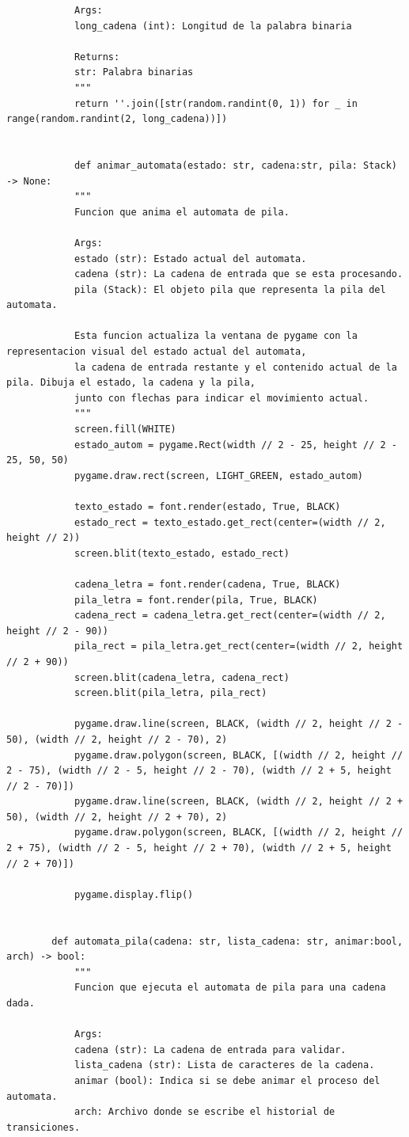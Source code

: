 \documentclass[11pt]{article} %
\begin{document}
\begin{lstlisting}
			Args:
			long_cadena (int): Longitud de la palabra binaria
			
			Returns:
			str: Palabra binarias
			"""
			return ''.join([str(random.randint(0, 1)) for _ in range(random.randint(2, long_cadena))])
			
			
			def animar_automata(estado: str, cadena:str, pila: Stack) -> None:
			"""
			Funcion que anima el automata de pila.
			
			Args:
			estado (str): Estado actual del automata.
			cadena (str): La cadena de entrada que se esta procesando.
			pila (Stack): El objeto pila que representa la pila del automata.
			
			Esta funcion actualiza la ventana de pygame con la representacion visual del estado actual del automata, 
			la cadena de entrada restante y el contenido actual de la pila. Dibuja el estado, la cadena y la pila, 
			junto con flechas para indicar el movimiento actual.
			"""
			screen.fill(WHITE)
			estado_autom = pygame.Rect(width // 2 - 25, height // 2 - 25, 50, 50)
			pygame.draw.rect(screen, LIGHT_GREEN, estado_autom)
			
			texto_estado = font.render(estado, True, BLACK)
			estado_rect = texto_estado.get_rect(center=(width // 2, height // 2))
			screen.blit(texto_estado, estado_rect)
			
			cadena_letra = font.render(cadena, True, BLACK)
			pila_letra = font.render(pila, True, BLACK)
			cadena_rect = cadena_letra.get_rect(center=(width // 2, height // 2 - 90))
			pila_rect = pila_letra.get_rect(center=(width // 2, height // 2 + 90))
			screen.blit(cadena_letra, cadena_rect)
			screen.blit(pila_letra, pila_rect)
			
			pygame.draw.line(screen, BLACK, (width // 2, height // 2 - 50), (width // 2, height // 2 - 70), 2)
			pygame.draw.polygon(screen, BLACK, [(width // 2, height // 2 - 75), (width // 2 - 5, height // 2 - 70), (width // 2 + 5, height // 2 - 70)])
			pygame.draw.line(screen, BLACK, (width // 2, height // 2 + 50), (width // 2, height // 2 + 70), 2)
			pygame.draw.polygon(screen, BLACK, [(width // 2, height // 2 + 75), (width // 2 - 5, height // 2 + 70), (width // 2 + 5, height // 2 + 70)])
			
			pygame.display.flip()
		
		
		def automata_pila(cadena: str, lista_cadena: str, animar:bool, arch) -> bool:
			"""
			Funcion que ejecuta el automata de pila para una cadena dada.
			
			Args:
			cadena (str): La cadena de entrada para validar.
			lista_cadena (str): Lista de caracteres de la cadena.
			animar (bool): Indica si se debe animar el proceso del automata.
			arch: Archivo donde se escribe el historial de transiciones.
			

\end{lstlisting}
\end{document}
